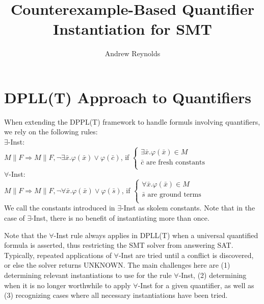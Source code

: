 \documentclass{llncs}
\begin{document}
\title{Counterexample-Based Quantifier Instantiation for SMT}

\author{Andrew Reynolds}

\date{}

\maketitle
\thispagestyle{empty}

\section{DPLL(T) Approach to Quantifiers}

When extending the DPPL(T) framework to handle formuls involving quantifiers, we rely on the following rules: \\

\noindent $\exists$-Inst: \\

$M \parallel F \Longrightarrow M \parallel F, \neg \exists \bar{x}. \varphi( \bar{ x } ) \vee \varphi( \bar{ c } )$, if   
$\begin{cases}
  \exists \bar{x}. \varphi( \bar{ x } ) \in M \\
  \bar{ c } \text{ are fresh constants} \\
\end{cases}$ \\

\noindent $\forall$-Inst: \\

$M \parallel F \Longrightarrow M \parallel F, \neg \forall \bar{x}. \varphi( \bar{ x } ) \vee \varphi( \bar{ s } )$, if   
$\begin{cases}
  \forall \bar{x}. \varphi( \bar{ x } ) \in M \\
  \bar{ s } \text{ are ground terms} \\
\end{cases}$ \\

We call the constants introduced in $\exists$-Inst as skolem constants.
Note that in the case of $\exists$-Inst, there is no benefit of instantiating more than once.

Note that the $\forall$-Inst rule always applies in DPLL(T) when a universal quantified formula is asserted, thus restricting the SMT solver from answering SAT.
Typically, repeated applications of $\forall$-Inst are tried until a conflict is discovered, or else the solver returns UNKNOWN.
The main challenges here are (1) determining relevant instantiations to use for the rule $\forall$-Inst, (2) determining when it is no longer worthwhile to apply $\forall$-Inst for a given quantifier, as well as (3) recognizing cases where all necessary instantiations have been tried.
\end{document}
